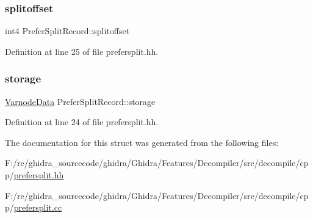 \subsubsection{\texorpdfstring{splitoffset}{splitoffset}}
{\footnotesize\ttfamily int4 Prefer\+Split\+Record\+::splitoffset}



Definition at line 25 of file prefersplit.\+hh.

\mbox{\label{struct_prefer_split_record_a0d2ddb729cfcc94f538fb2a4018dd579}} 
\subsubsection{\texorpdfstring{storage}{storage}}
{\footnotesize\ttfamily \mbox{\hyperlink{struct_varnode_data}{Varnode\+Data}} Prefer\+Split\+Record\+::storage}



Definition at line 24 of file prefersplit.\+hh.



The documentation for this struct was generated from the following files\+:\begin{DoxyCompactItemize}
\item 
F\+:/re/ghidra\+\_\+sourcecode/ghidra/\+Ghidra/\+Features/\+Decompiler/src/decompile/cpp/\mbox{\hyperlink{prefersplit_8hh}{prefersplit.\+hh}}\item 
F\+:/re/ghidra\+\_\+sourcecode/ghidra/\+Ghidra/\+Features/\+Decompiler/src/decompile/cpp/\mbox{\hyperlink{prefersplit_8cc}{prefersplit.\+cc}}\end{DoxyCompactItemize}
